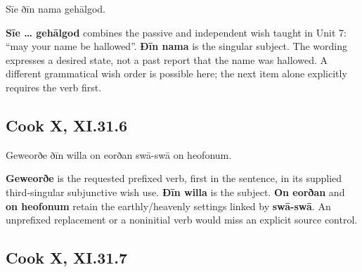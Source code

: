 \par\begin{minipage}{\linewidth}\raggedright
Sīe ðīn nama gehālgod.

\textbf{Sīe … gehālgod} combines the passive and independent wish taught in Unit 7: “may your name be hallowed”. \textbf{Ðīn nama} is the singular subject. The wording expresses a desired state, not a past report that the name was hallowed. A different grammatical wish order is possible here; the next item alone explicitly requires the verb first.

\end{minipage}\par\addvspace{4pt}

\subsection*{Cook X, XI.31.6}

\par\begin{minipage}{\linewidth}\raggedright
Geweorðe ðīn willa on eorðan swā-swā on heofonum.

\textbf{Geweorðe} is the requested prefixed verb, first in the sentence, in its supplied third-singular subjunctive wish use. \textbf{Ðīn willa} is the subject. \textbf{On eorðan} and \textbf{on heofonum} retain the earthly/\allowbreak{}heavenly settings linked by \textbf{swā-swā}. An unprefixed replacement or a noninitial verb would miss an explicit source control.

\end{minipage}\par\addvspace{4pt}

\subsection*{Cook X, XI.31.7}

